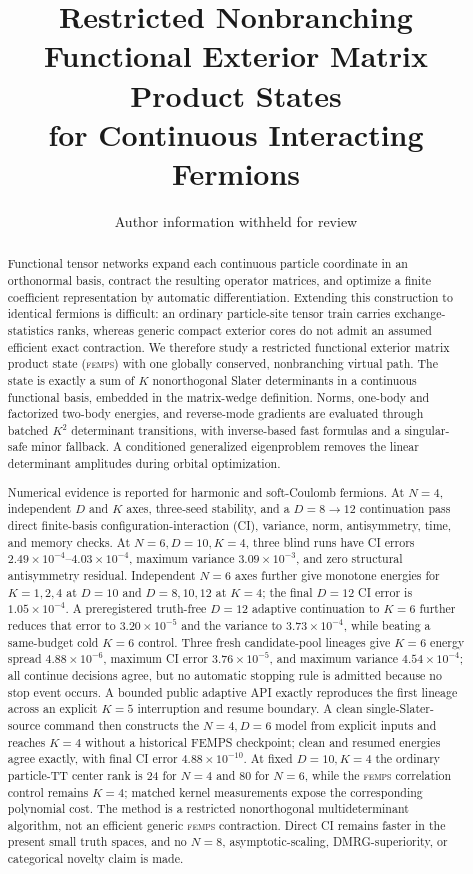 \documentclass[11pt]{article}
\title{Restricted Nonbranching Functional Exterior Matrix Product States\\
for Continuous Interacting Fermions}
\author{Author information withheld for review}
\date{}
\newcommand{\FEMPS}{\textnormal{\textsc{femps}}}
\begin{document}
\maketitle

\begin{abstract}
Functional tensor networks expand each continuous particle coordinate in an
orthonormal basis, contract the resulting operator matrices, and optimize a
finite coefficient representation by automatic differentiation.  Extending
this construction to identical fermions is difficult: an ordinary
particle-site tensor train carries exchange-statistics ranks, whereas generic
compact exterior cores do not admit an assumed efficient exact contraction.
We therefore study a restricted functional exterior matrix product state
(\FEMPS) with one globally conserved, nonbranching virtual path.  The state is
exactly a sum of $K$ nonorthogonal Slater determinants in a continuous
functional basis, embedded in the matrix-wedge definition.  Norms, one-body
and factorized two-body energies, and reverse-mode gradients are evaluated
through batched $K^2$ determinant transitions, with inverse-based fast formulas
and a singular-safe minor fallback.  A conditioned generalized eigenproblem removes
the linear determinant amplitudes during orbital optimization.

Numerical evidence is reported for harmonic and soft-Coulomb fermions.  At
$N=4$, independent $D$ and $K$ axes, three-seed stability, and a
$D=8\to12$ continuation pass direct finite-basis configuration-interaction
(CI), variance, norm, antisymmetry, time, and memory checks.  At
$N=6,D=10,K=4$, three blind runs have CI errors
$2.49\times10^{-4}$--$4.03\times10^{-4}$, maximum variance
$3.09\times10^{-3}$, and zero structural antisymmetry residual.  Independent
$N=6$ axes further give monotone energies for $K=1,2,4$ at $D=10$ and
$D=8,10,12$ at $K=4$; the final $D=12$ CI error is
$1.05\times10^{-4}$.  A preregistered truth-free $D=12$ adaptive continuation
to $K=6$ further reduces that error to $3.20\times10^{-5}$ and the variance to
$3.73\times10^{-4}$, while beating a same-budget cold $K=6$ control.  Three
fresh candidate-pool lineages give $K=6$ energy spread $4.88\times10^{-6}$,
maximum CI error $3.76\times10^{-5}$, and maximum variance
$4.54\times10^{-4}$; all continue decisions agree, but no automatic stopping
rule is admitted because no stop event occurs.  A bounded public adaptive API
exactly reproduces the first lineage across an explicit $K=5$ interruption and
resume boundary.  A clean single-Slater-source command then constructs the
$N=4,D=6$ model from explicit inputs and reaches $K=4$ without a historical
FEMPS checkpoint; clean and resumed energies agree exactly, with final CI error
$4.88\times10^{-10}$.  At fixed $D=10,K=4$ the ordinary particle-TT center rank is 24 for $N=4$ and 80 for
$N=6$, while the \FEMPS{} correlation control remains $K=4$; matched kernel
measurements expose the corresponding polynomial cost.  The method is a
restricted nonorthogonal multideterminant algorithm, not an efficient generic
\FEMPS{} contraction.  Direct CI remains faster in the present small truth
spaces, and no $N=8$, asymptotic-scaling, DMRG-superiority, or categorical
novelty claim is made.
\end{abstract}
\end{document}
